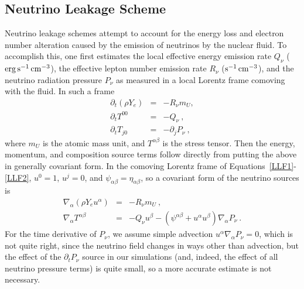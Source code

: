 \subsection{Neutrino Leakage Scheme}
\label{sec:leakage}
Neutrino leakage schemes attempt to account for
the energy loss and electron number alteration caused
by the emission of neutrinos by the nuclear fluid.  To accomplish this, one
first estimates the local effective energy emission rate
$Q_{\nu}$ ($\rm erg\,s^{-1}\,cm^{-3}$), the effective lepton number
emission rate $R_{\nu}$ ($\rm s^{-1}\,cm^{-3}$), and the neutrino
radiation pressure $P_{\nu}$ as measured in a local
Lorentz frame comoving with the fluid.  In such a frame
\begin{eqnarray}
\label{LLF1}
\partial_t (\rho Y_e) &=& -R_{\nu}m_U , \\
\partial_t T^{00} &=& -Q_{\nu}\ , \\
\label{LLF2}
\partial_t T_{j0} &=& -\partial_j P_{\nu}\ ,
\end{eqnarray}
where $m_U$ is the atomic mass unit,
and $T^{\alpha\beta}$ is the stress tensor.
Then the energy,
momentum, and composition source terms
follow directly from putting the above in generally
covariant form.  In the comoving Lorentz frame of
Equations~\ref{LLF1}-\ref{LLF2}, $u^0=1$, $u^j=0$,
and $\psi_{\alpha\beta}=\eta_{\alpha\beta}$,
so a covariant form of the neutrino sources is
\begin{eqnarray}
  \nabla_{\alpha}(\rho Y_e u^{\alpha}) &=& -R_{\nu}m_U\ , \\
  \nabla_{\alpha}T^{\alpha\beta} &=& -Q_{\nu}u^{\beta}
  - (\psi^{\alpha\beta}+u^{\alpha}u^{\beta})\nabla_{\alpha}P_{\nu}\ .
\end{eqnarray}
For the time derivative of $P_{\nu}$, we assume simple
advection $u^{\alpha}\nabla_{\alpha}P_{\nu}=0$, which is
not quite right, since the neutrino field changes in ways other
than advection, but the effect of the $\partial_tP_{\nu}$
source in our simulations (and, indeed, the effect of all neutrino
pressure terms) is quite small, so a more accurate
estimate is not necessary.

